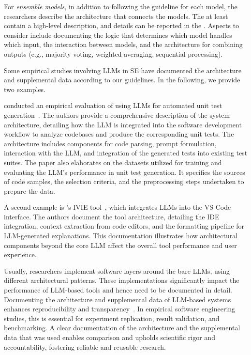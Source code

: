 For \emph{ensemble models}, in addition to following the \modelversion guideline for each model, the researchers \must describe the architecture that connects the models.
The \paper \must at least contain a high-level description, and details can be reported in the \supplementarymaterial.
Aspects to consider include documenting the logic that determines which model handles which input, the interaction between models, and the architecture for combining outputs (e.g., majority voting, weighted averaging, sequential processing).


Some empirical studies involving LLMs in SE have documented the architecture and supplemental data according to our guidelines. In the following, we provide two examples.

\citeauthor{DBLP:journals/tse/SchaferNET24} conducted an empirical evaluation of using LLMs for automated unit test generation~\cite{DBLP:journals/tse/SchaferNET24}.
The authors provide a comprehensive description of the system architecture, detailing how the LLM is integrated into the software development workflow to analyze codebases and produce the corresponding unit tests.
The architecture includes components for code parsing, prompt formulation, interaction with the LLM, and integration of the generated tests into existing test suites.
The paper also elaborates on the datasets utilized for training and evaluating the LLM's performance in unit test generation.
It specifies the sources of code samples, the selection criteria, and the preprocessing steps undertaken to prepare the data.

A second example is \citeauthor{DBLP:conf/chi/YanHWH24}'s IVIE tool~\cite{DBLP:conf/chi/YanHWH24}, which integrates LLMs into the VS Code interface.
The authors document the tool architecture, detailing the IDE integration, context extraction from code editors, and the formatting pipeline for LLM-generated explanations.
This documentation illustrates how architectural components beyond the core LLM affect the overall tool performance and user experience.


Usually, researchers implement software layers around the bare LLMs, using different architectural patterns.
These implementations significantly impact the performance of LLM-based tools and hence need to be documented in detail.
Documenting the architecture and supplemental data of LLM-based systems enhances reproducibility and transparency~\cite{DBLP:journals/software/LuZXXW24}.
In empirical software engineering studies, this is essential for experiment replication, result validation, and benchmarking.
A clear documentation of the architecture and the supplemental data that was used enables comparison and upholds scientific rigor and accountability, fostering reliable and reusable research.

